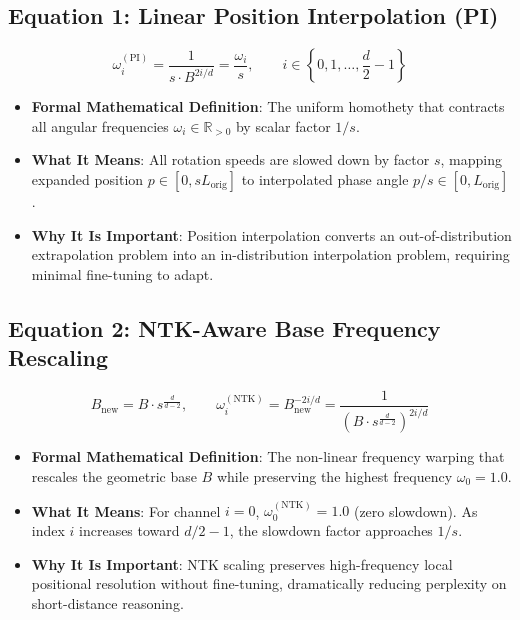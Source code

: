 \documentclass[11pt,a4paper]{article}
\theoremstyle{definition}
\begin{document}
\subsection{\textbf{Equation 1: Linear Position Interpolation (PI)}}
{\boldmath
\begin{equation}
\omega_i^{(\text{PI})} = \frac{1}{s \cdot B^{2i / d}} = \frac{\omega_i}{s}, \qquad i \in \left\{0, 1, \dots, \frac{d}{2} - 1\right\}
\end{equation}
}
\begin{itemize}
    \item \textbf{Formal Mathematical Definition}:
    The uniform homothety that contracts all angular frequencies $\omega_i \in \mathbb{R}_{> 0}$ by scalar factor $1/s$.
    \item \textbf{What It Means}:
    All rotation speeds are slowed down by factor $s$, mapping expanded position $p \in [0, s L_{\text{orig}}]$ to interpolated phase angle $p / s \in [0, L_{\text{orig}}]$.
    \item \textbf{Why It Is Important}:
    Position interpolation converts an out-of-distribution extrapolation problem into an in-distribution interpolation problem, requiring minimal fine-tuning to adapt.
\end{itemize}

\subsection{\textbf{Equation 2: NTK-Aware Base Frequency Rescaling}}
{\boldmath
\begin{equation}
B_{\text{new}} = B \cdot s^{\frac{d}{d - 2}}, \qquad \omega_i^{(\text{NTK})} = B_{\text{new}}^{-2i / d} = \frac{1}{\left( B \cdot s^{\frac{d}{d-2}} \right)^{2i / d}}
\end{equation}
}
\begin{itemize}
    \item \textbf{Formal Mathematical Definition}:
    The non-linear frequency warping that rescales the geometric base $B$ while preserving the highest frequency $\omega_0 = 1.0$.
    \item \textbf{What It Means}:
    For channel $i=0$, $\omega_0^{(\text{NTK})} = 1.0$ (zero slowdown). As index $i$ increases toward $d/2 - 1$, the slowdown factor approaches $1/s$.
    \item \textbf{Why It Is Important}:
    NTK scaling preserves high-frequency local positional resolution without fine-tuning, dramatically reducing perplexity on short-distance reasoning.
\end{itemize}
\end{document}
